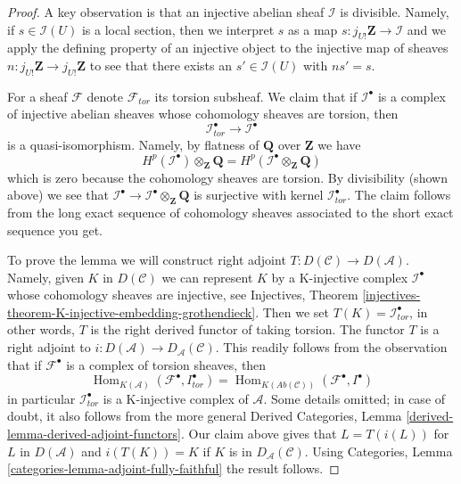 \documentclass[10pt,a4paper]{amsart}
\theoremstyle{plain}
\theoremstyle{definition}
\theoremstyle{remark}
\numberwithin{equation}{subsection}
\def\Hom{\mathop{\mathrm{Hom}}\nolimits}
\begin{document}
\begin{proof}
A key observation is that an injective abelian sheaf $\mathcal{I}$
is divisible. Namely, if $s \in \mathcal{I}(U)$ is a local section,
then we interpret $s$ as a map
$s : j_{U!}\mathbf{Z} \to \mathcal{I}$ and we apply the
defining property of an injective object to
the injective map of sheaves $n : j_{U!}\mathbf{Z} \to j_{U!}\mathbf{Z}$
to see that there exists an $s' \in \mathcal{I}(U)$ with $ns' = s$.

\medskip\noindent
For a sheaf $\mathcal{F}$ denote $\mathcal{F}_{tor}$ its torsion subsheaf.
We claim that if $\mathcal{I}^\bullet$ is a complex of injective abelian
sheaves whose cohomology sheaves are torsion, then
$$
\mathcal{I}^\bullet_{tor} \to \mathcal{I}^\bullet
$$
is a quasi-isomorphism. Namely, by flatness of $\mathbf{Q}$ over $\mathbf{Z}$
we have
$$
H^p(\mathcal{I}^\bullet) \otimes_\mathbf{Z} \mathbf{Q} =
H^p(\mathcal{I}^\bullet \otimes_\mathbf{Z} \mathbf{Q})
$$
which is zero because the cohomology sheaves are torsion.
By divisibility (shown above) we see that
$\mathcal{I}^\bullet \to \mathcal{I}^\bullet \otimes_\mathbf{Z} \mathbf{Q}$
is surjective with kernel $\mathcal{I}^\bullet_{tor}$.
The claim follows from the long exact sequence of cohomology sheaves
associated to the short exact sequence you get.

\medskip\noindent
To prove the lemma we will construct right adjoint
$T : D(\mathcal{C}) \to D(\mathcal{A})$. Namely, given $K$
in $D(\mathcal{C})$ we can represent $K$ by a K-injective complex
$\mathcal{I}^\bullet$ whose cohomology sheaves are injective, see
Injectives, Theorem
\ref{injectives-theorem-K-injective-embedding-grothendieck}.
Then we set $T(K) = \mathcal{I}^\bullet_{tor}$, in other words,
$T$ is the right derived functor of taking torsion.
The functor $T$ is a right adjoint to
$i : D(\mathcal{A}) \to D_\mathcal{A}(\mathcal{C})$.
This readily follows from the observation that
if $\mathcal{F}^\bullet$ is a complex of torsion sheaves, then
$$
\Hom_{K(\mathcal{A})}(\mathcal{F}^\bullet, I^\bullet_{tor}) =
\Hom_{K(\textit{Ab}(\mathcal{C}))}(\mathcal{F}^\bullet, I^\bullet)
$$
in particular $\mathcal{I}^\bullet_{tor}$ is a K-injective complex
of $\mathcal{A}$. Some details omitted; in case of doubt, it also
follows from the more general
Derived Categories, Lemma \ref{derived-lemma-derived-adjoint-functors}.
Our claim above gives that $L = T(i(L))$ for $L$ in $D(\mathcal{A})$
and $i(T(K)) = K$ if $K$ is in $D_\mathcal{A}(\mathcal{C})$.
Using Categories, Lemma \ref{categories-lemma-adjoint-fully-faithful}
the result follows.
\end{proof}
\end{document}
